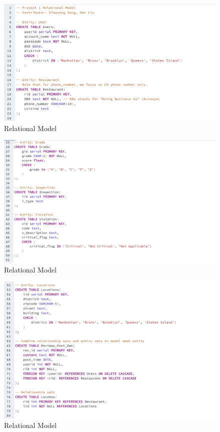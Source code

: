 \documentclass[a4paper,12pt]{article}
\theoremstyle{definition}
\begin{document}
\begin{figure}[h]
    \centering
    \includegraphics[scale = 0.58]{1.png}
    \caption{Relational Model}
    \label{fig:1}
\end{figure}
\begin{figure}[h]
    \centering
    \includegraphics[scale = 0.58]{2.png}
    \caption{Relational Model}
    \label{fig:2}
\end{figure}
\begin{figure}[h]
    \centering
    \includegraphics[scale = 0.60]{3.png}
    \caption{Relational Model}
    \label{fig:3}
\end{figure}
\end{document}
